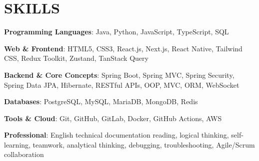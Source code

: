 \section{SKILLS}
\resumeSubHeadingListStart

  \item
    \resumeItemListStart
      \item \textbf{Programming Languages}: Java, Python, JavaScript, TypeScript, SQL
      \item \textbf{Web \& Frontend}: HTML5, CSS3, React.js, Next.js, React Native, Tailwind CSS, Redux Toolkit, Zustand, TanStack Query
      \item \textbf{Backend \& Core Concepts}: Spring Boot, Spring MVC, Spring Security, Spring Data JPA, Hibernate, RESTful APIs, OOP, MVC, ORM, WebSocket
      \item \textbf{Databases}: PostgreSQL, MySQL, MariaDB, MongoDB, Redis
      \item \textbf{Tools \& Cloud}: Git, GitHub, GitLab, Docker, GitHub Actions, AWS
      \item \textbf{Professional}: English technical documentation reading, logical thinking, self-learning, teamwork, analytical thinking, debugging, troubleshooting, Agile/Scrum collaboration
    \resumeItemListEnd

\resumeSubHeadingListEnd
